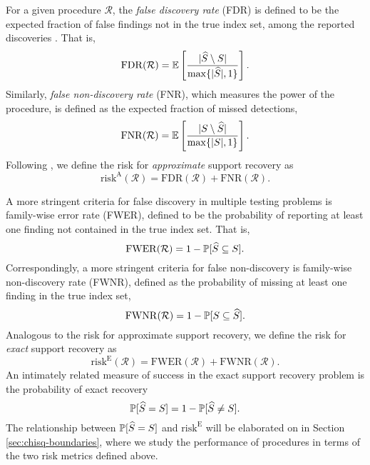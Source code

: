 For a given procedure $\mathcal{R}$, the \emph{false discovery rate} (FDR) is defined to be the expected fraction of false findings not in the true index set, among the reported discoveries \cite{benjamini1995controlling}. That is,
\begin{equation} \label{eq:FDR}
    \mathrm{FDR}(\mathcal{R}) = \E\left[\frac{|\widehat{S}\setminus S|}{\max\{|\widehat{S}|,1\}}\right].
\end{equation}
Similarly, \emph{false non-discovery rate} (FNR), which measures the power of the procedure, is defined as the expected fraction of missed detections,
\begin{equation} \label{eq:FNR}
    \mathrm{FNR}(\mathcal{R}) = \E\left[\frac{|S\setminus \widehat{S}|}{\max\{|{S}|,1\}}\right].
\end{equation}
Following \cite{arias2017distribution}, we define the risk for \emph{approximate} support recovery as
\begin{equation} \label{eq:risk-approximate}
    \mathrm{risk}^{\mathrm{A}}(\mathcal{R}) = \mathrm{FDR}(\mathcal{R}) + \mathrm{FNR}(\mathcal{R}).
\end{equation}

A more stringent criteria for false discovery in multiple testing problems is family-wise error rate (FWER), defined to be the probability of reporting at least one finding not contained in the true index set.
That is,
\begin{equation} \label{eq:FWER}
    \mathrm{FWER}(\mathcal{R}) = 1 - \P[\widehat{S} \subseteq S].
\end{equation}
Correspondingly, a more stringent criteria for false non-discovery is family-wise non-discovery rate (FWNR), defined as the probability of missing at least one finding in the true index set,
\begin{equation} \label{eq:FWNDR}
    \mathrm{FWNR}(\mathcal{R}) = 1 - \P[S \subseteq \widehat{S}].
\end{equation}
Analogous to the risk for approximate support recovery, we define the risk for \emph{exact} support recovery as
\begin{equation} \label{eq:risk-exact}
    \mathrm{risk}^{\mathrm{E}}(\mathcal{R}) = \mathrm{FWER}(\mathcal{R}) + \mathrm{FWNR}(\mathcal{R}).
\end{equation}
An intimately related measure of success in the exact support recovery problem is the probability of exact recovery 
\begin{equation} \label{eq:risk-prob}
    \P[\widehat{S} = S] = 1 - \P[\widehat{S} \neq S].
\end{equation}
The relationship between $\P[\widehat{S} = S]$ and $\mathrm{risk}^{\mathrm{E}}$ will be elaborated on in Section \ref{sec:chisq-boundaries}, where we study the performance of procedures in terms of the two risk metrics defined above.

